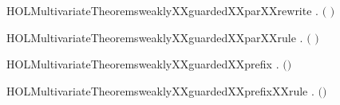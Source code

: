 \newcommand{\HOLMultivariateTheoremsweaklyXXguardedXXpar}{\UseVerbatim{HOLMultivariateTheoremsweaklyXXguardedXXpar}}
\begin{SaveVerbatim}{HOLMultivariateTheoremsweaklyXXguardedXXparXXrewrite}
\HOLTokenTurnstile{} \HOLSymConst{\HOLTokenForall{}}  .
         \ensuremath{(} \HOLSymConst{\ensuremath{\mid}} \ensuremath{)} \HOLSymConst{\HOLTokenEquiv{}}
          \HOLSymConst{\HOLTokenConj{}}   
\end{SaveVerbatim}
\newcommand{\HOLMultivariateTheoremsweaklyXXguardedXXparXXrewrite}{\UseVerbatim{HOLMultivariateTheoremsweaklyXXguardedXXparXXrewrite}}
\begin{SaveVerbatim}{HOLMultivariateTheoremsweaklyXXguardedXXparXXrule}
\HOLTokenTurnstile{} \HOLSymConst{\HOLTokenForall{}}  .
          \HOLSymConst{\HOLTokenConj{}}    \HOLSymConst{\HOLTokenImp{}}
         \ensuremath{(} \HOLSymConst{\ensuremath{\mid}} \ensuremath{)}
\end{SaveVerbatim}
\newcommand{\HOLMultivariateTheoremsweaklyXXguardedXXparXXrule}{\UseVerbatim{HOLMultivariateTheoremsweaklyXXguardedXXparXXrule}}
\begin{SaveVerbatim}{HOLMultivariateTheoremsweaklyXXguardedXXprefix}
\HOLTokenTurnstile{} \HOLSymConst{\HOLTokenForall{}}  .   \ensuremath{(}\HOLSymConst{\ensuremath{\ldotp}}\ensuremath{)} \HOLSymConst{\HOLTokenImp{}}   
\end{SaveVerbatim}
\newcommand{\HOLMultivariateTheoremsweaklyXXguardedXXprefix}{\UseVerbatim{HOLMultivariateTheoremsweaklyXXguardedXXprefix}}
\begin{SaveVerbatim}{HOLMultivariateTheoremsweaklyXXguardedXXprefixXXrule}
\HOLTokenTurnstile{} \HOLSymConst{\HOLTokenForall{}}  .    \HOLSymConst{\HOLTokenImp{}}   \ensuremath{(}\HOLSymConst{\ensuremath{\ldotp}}\ensuremath{)}
\end{SaveVerbatim}
